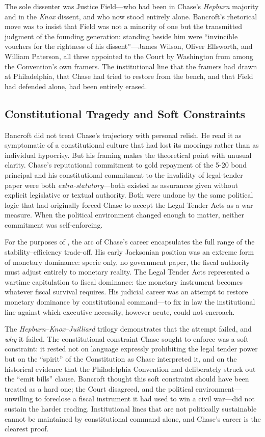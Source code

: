 \documentclass[12pt]{article}
\begin{document}
The sole dissenter was Justice Field---who had been in Chase's
\textit{Hepburn} majority and in the \textit{Knox} dissent, and who
now stood entirely alone.  Bancroft's rhetorical move was to insist
that Field was not a minority of one but the transmitted judgment of
the founding generation: standing beside him were ``invincible vouchers
for the rightness of his dissent''---James Wilson, Oliver Ellsworth,
and William Paterson, all three appointed to the Court by Washington
from among the Convention's own framers.  The institutional line that
the framers had drawn at Philadelphia, that Chase had tried to restore
from the bench, and that Field had defended alone, had been entirely
erased.

\subsection{Constitutional Tragedy and Soft Constraints}

Bancroft did not treat Chase's trajectory with personal relish.  He
read it as symptomatic of a constitutional culture that had lost its
moorings rather than as individual hypocrisy.  But his framing makes
the theoretical point with unusual clarity.  Chase's reputational
commitment to gold repayment of the 5-20 bond principal and his
constitutional commitment to the invalidity of legal-tender paper were
both \textit{extra-statutory}---both existed as assurances given without
explicit legislative or textual authority.  Both were undone by the same
political logic that had originally forced Chase to accept the Legal
Tender Acts as a war measure.  When the political environment changed
enough to matter, neither commitment was self-enforcing.

For the purposes of \citet{Sargent2011}, the arc of Chase's career
encapsulates the full range of the stability--efficiency trade-off.  His
early Jacksonian position was an extreme form of monetary dominance:
specie only, no government paper, the fiscal authority must adjust
entirely to monetary reality.  The Legal Tender Acts represented a
wartime capitulation to fiscal dominance: the monetary instrument
becomes whatever fiscal survival requires.  His judicial career was an
attempt to restore monetary dominance by constitutional command---to fix
in law the institutional line against which executive necessity, however
acute, could not encroach.

The \textit{Hepburn}--\textit{Knox}--\textit{Juilliard} trilogy
demonstrates that the attempt failed, and \textit{why} it failed.
The constitutional constraint Chase sought to enforce was a soft
constraint: it rested not on language expressly prohibiting the legal
tender power but on the ``spirit'' of the Constitution as Chase
interpreted it, and on the historical evidence that the Philadelphia
Convention had deliberately struck out the ``emit bills'' clause.
Bancroft thought this soft constraint should have been treated as a
hard one; the Court disagreed, and the political environment---
unwilling to foreclose a fiscal instrument it had used to win a
civil war---did not sustain the harder reading.  Institutional lines
that are not politically sustainable cannot be maintained by
constitutional command alone, and Chase's career is the clearest proof.
\end{document}
